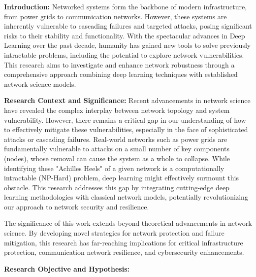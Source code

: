 \begin{outline-of-proposed-research}
\vspace{-1.0em}
\textbf{Introduction:} Networked systems form the backbone of modern infrastructure, from power grids to communication networks. However, these systems are inherently vulnerable to cascading failures\cite{dobson2007complex, bakshy2011everyone} and targeted attacks,\cite{albert2000attack, cohen2001breakdown} posing significant risks to their stability and functionality. With the spectacular advances in Deep Learning over the past decade, humanity has gained new tools to solve previously intractable problems,\cite{mnih_playing_2013, silver_general_2018, moravcik_deepstack_2017, vinyals_grandmaster_2019} including the potential to explore network vulnerabilities.\cite{dai_learning_2017} This research aims to investigate and enhance network robustness through a comprehensive approach combining deep learning techniques with established network science models.

\textbf{Research Context and Significance:} Recent advancements in network science have revealed the complex interplay between network topology and system vulnerability.\cite{DSouza2013} However, there remains a critical gap in our understanding of how to effectively mitigate these vulnerabilities,\cite{brummitt2012suppressing, Bhaumik2013, Vieira2007, buldyrev2010catastrophic, rosato2008modelling, Motter2002} especially in the face of sophisticated attacks or cascading failures. Real-world networks such as power grids are fundamentally vulnerable to attacks on a small number of key components (nodes), whose removal can cause the system as a whole to collapse. While identifying these "Achilles Heels" of a given network is a computationally intractable (NP-Hard) problem, deep learning might effectively surmount this obstacle.\cite{silver_general_2018, moravcik_deepstack_2017, vinyals_grandmaster_2019, dai_learning_2017} This research addresses this gap by integrating cutting-edge deep learning methodologies with classical network models, potentially revolutionizing our approach to network security and resilience.

The significance of this work extends beyond theoretical advancements in network science. By developing novel strategies for network protection and failure mitigation, this research has far-reaching implications for critical infrastructure protection, communication network resilience, and cybersecurity enhancements.

\textbf{Research Objective and Hypothesis:}


\end{outline-of-proposed-research}
